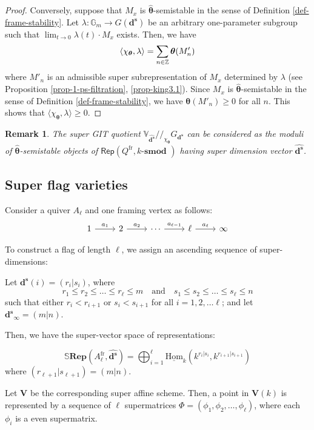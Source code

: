 \documentclass[12pt, reqno]{amsart}
\theoremstyle{plain}
\newtheorem{remark}[theorem]{Remark}
\numberwithin{equation}{section}
\def \sd{\mathbf{d^s}}
\def \bS{\mathbb{S}}
\def \bfR{\mathbf{Rep}}
\def \btheta{\boldsymbol{\theta}}
\newcommand{\smod} {k\text{-}\textbf{smod }}
\newcommand{\uHom}{\mathrm{\underline{Hom}}}
\begin{document}
\begin{proof}
Conversely, suppose that $M_x$ is $\hat{\btheta}$-semistable in the sense of Definition \ref{def-frame-stability}. Let $\lambda \colon \mathbb{G}_m \to G(\sd)$ be an arbitrary one-parameter subgroup such that $\lim_{t \to 0} \lambda(t) \cdot M_x$ exists. Then, we have
\[
\langle \chi_{\btheta}, \lambda \rangle 
= \sum_{n \in \mathbb{Z}} \btheta(M'_{n}) \\
\]
where $M'_n$ is an admissible super subrepresentation of $M_x$
determined by $\lambda$ (see Proposition \ref{prop-1-ps-filtration}, \ref{prop-king3.1}). Since $M_x$ is $\hat{\btheta}$-semistable in the sense of Definition \ref{def-frame-stability}, we have $\btheta(M'_{n}) \ge 0$ for all $n$. This shows that $\langle \chi_{\btheta}, \lambda \rangle \ge 0$. 
\end{proof}

\begin{remark}{\rm
The super GIT quotient $\mathbb{V}_{\hat{\sd}}/ \!\! /_{\! \!\chi_{\btheta}} G_\sd$ can be considered as the moduli of  $\hat{\btheta}$-semistable objects of $\mathsf{Rep}(Q^{\mathrm{fr}}, \smod)$ having super dimension vector $\hat{\sd}$.
}
\end{remark}

\subsection{Super flag varieties}
Consider a quiver $A_\ell$ and one framing vertex as follows: 
\[
\begin{tikzcd}
1 \arrow[r, "a_1"] & 2 \arrow[r, "a_2"] & \cdots \arrow[r, "a_{\ell-1}"] & \ell \arrow[r, "a_\ell"] & \infty
\end{tikzcd}
\]

To construct a flag of length $\ell$, we assign an ascending sequence of super-dimensions:

Let $\sd(i) = (r_i|s_i)$, where 
    \[ r_1 \leq r_2 \leq \dots \leq r_\ell \leq m \quad \text{and} \quad s_1 \leq s_2 \leq \dots \leq s_\ell \leq n \]
    such that either $r_i < r_{i+1}$ or $s_i < s_{i+1}$ for all $i = 1, 2, \dots \ell$; and let $\sd_\infty = (m|n)$. 

Then, we have the super-vector space of representations:

\[ \bS\bfR(A_\ell^{\mathrm{fr}}, \hat{\sd}) = \bigoplus_{i=1}^\ell \uHom_k(k^{r_i|s_i}, k^{r_{i+1}|s_{i+1}}) \]
where $(r_{\ell+1}|s_{\ell+1}) = (m|n)$.

Let $\mathbf{V}$ be the corresponding super affine scheme. Then,
a point in $\mathbf{V}(k)$ is represented by a sequence of $\ell$ supermatrices $\Phi = (\phi_1, \phi_2, \dots, \phi_\ell)$, where each $\phi_i$ is a even supermatrix.
\end{document}
